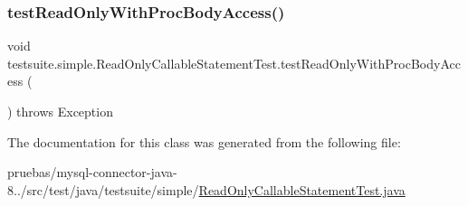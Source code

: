 \subsubsection{\texorpdfstring{test\+Read\+Only\+With\+Proc\+Body\+Access()}{testReadOnlyWithProcBodyAccess()}}
{\footnotesize\ttfamily void testsuite.\+simple.\+Read\+Only\+Callable\+Statement\+Test.\+test\+Read\+Only\+With\+Proc\+Body\+Access (\begin{DoxyParamCaption}{ }\end{DoxyParamCaption}) throws Exception}



The documentation for this class was generated from the following file\+:\begin{DoxyCompactItemize}
\item 
pruebas/mysql-\/connector-\/java-\/8../src/test/java/testsuite/simple/\mbox{\hyperlink{_read_only_callable_statement_test_8java}{Read\+Only\+Callable\+Statement\+Test.\+java}}\end{DoxyCompactItemize}
